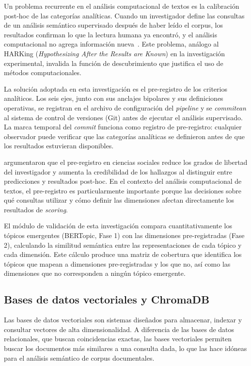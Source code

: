 Un problema recurrente en el análisis computacional de textos es la calibración post-hoc de las categorías analíticas. Cuando un investigador define las consultas de un análisis semántico supervisado después de haber leído el corpus, los resultados confirman lo que la lectura humana ya encontró, y el análisis computacional no agrega información nueva~\citep{grimmer2013text}. Este problema, análogo al HARKing (\textit{Hypothesizing After the Results are Known}) en la investigación experimental, invalida la función de descubrimiento que justifica el uso de métodos computacionales.

La solución adoptada en esta investigación es el pre-registro de los criterios analíticos. Los seis ejes, junto con sus anclajes bipolares y sus definiciones operativas, se registran en el archivo de configuración del \textit{pipeline} y se \textit{commitean} al sistema de control de versiones (Git) antes de ejecutar el análisis supervisado. La marca temporal del \textit{commit} funciona como registro de pre-registro: cualquier observador puede verificar que las categorías analíticas se definieron antes de que los resultados estuvieran disponibles.

\citet{nosek2018preregistration} argumentaron que el pre-registro en ciencias sociales reduce los grados de libertad del investigador y aumenta la credibilidad de los hallazgos al distinguir entre predicciones y resultados post-hoc. En el contexto del análisis computacional de textos, el pre-registro es particularmente importante porque las decisiones sobre qué consultas utilizar y cómo definir las dimensiones afectan directamente los resultados de \textit{scoring}.

El módulo de validación de esta investigación compara cuantitativamente los tópicos emergentes (BERTopic, Fase 1) con las dimensiones pre-registradas (Fase 2), calculando la similitud semántica entre las representaciones de cada tópico y cada dimensión. Este cálculo produce una matriz de cobertura que identifica los tópicos que mapean a dimensiones pre-registradas y los que no, así como las dimensiones que no corresponden a ningún tópico emergente.


\subsection{Bases de datos vectoriales y ChromaDB}

Las bases de datos vectoriales son sistemas diseñados para almacenar, indexar y consultar vectores de alta dimensionalidad. A diferencia de las bases de datos relacionales, que buscan coincidencias exactas, las bases vectoriales permiten buscar los documentos más similares a una consulta dada, lo que las hace idóneas para el análisis semántico de corpus documentales.


